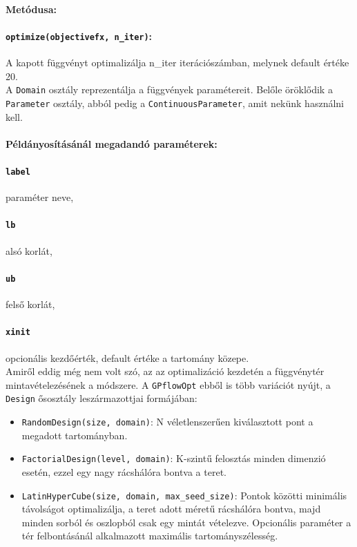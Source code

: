 \paragraph{Metódusa:}
\paragraph{\texttt{optimize(objectivefx, n\_iter)}:} A kapott függvényt optimalizálja n\_iter iterációszámban, melynek default értéke 20.\\

A \texttt{Domain} osztály reprezentálja a függvények paramétereit. Belőle öröklődik a \texttt{Parameter} osztály, abból pedig a \texttt{ContinuousParameter}, amit nekünk használni kell. \paragraph{Példányosításánál megadandó paraméterek:}
\paragraph{\texttt{label}} paraméter neve,
\paragraph{\texttt{lb}} alsó korlát,
\paragraph{\texttt{ub}} felső korlát,
\paragraph{\texttt{xinit}} opcionális kezdőérték, default értéke a tartomány közepe.\\

Amiről eddig még nem volt szó, az az optimalizáció kezdetén a függvénytér mintavételezésének a módszere. A \texttt{GPflowOpt} ebből is több variációt nyújt, a \texttt{Design} ősosztály leszármazottjai formájában: 
\begin{itemize}
	\item \texttt{RandomDesign(size, domain)}: N véletlenszerűen kiválasztott pont a megadott tartományban.
	\item \texttt{FactorialDesign(level, domain)}: K-szintű felosztás minden dimenzió esetén, ezzel egy nagy rácshálóra bontva a teret.
	\item \texttt{LatinHyperCube(size, domain, max\_seed\_size)}: Pontok közötti minimális távolságot optimalizálja, a teret adott méretű rácshálóra bontva, majd minden sorból és oszlopból csak egy mintát vételezve. Opcionális paraméter a tér felbontásánál alkalmazott maximális tartományszélesség.
\end{itemize}

